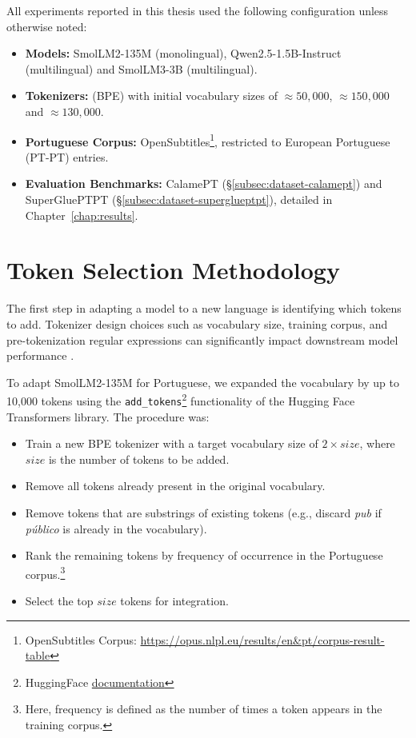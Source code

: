All experiments reported in this thesis used the following configuration unless otherwise noted:
\begin{itemize}
    \item \textbf{Models:} SmolLM2-135M (monolingual), Qwen2.5-1.5B-Instruct (multilingual) and SmolLM3-3B (multilingual).
    \item \textbf{Tokenizers:} (BPE) with initial vocabulary sizes of  $\approx 50,000$, $\approx 150,000$ and $\approx 130,000$.
    \item \textbf{Portuguese Corpus:} OpenSubtitles\footnote{OpenSubtitles Corpus: \url{https://opus.nlpl.eu/results/en&pt/corpus-result-table}}, restricted to European Portuguese (PT-PT) entries.
    \item \textbf{Evaluation Benchmarks:} CalamePT (\S\ref{subsec:dataset-calamept}) and SuperGluePTPT (\S\ref{subsec:dataset-superglueptpt}), detailed in Chapter~\ref{chap:results}.
\end{itemize}

\section{Token Selection Methodology}
\label{sec:token_selection}

The first step in adapting a model to a new language is identifying which tokens to add. Tokenizer design choices such as vocabulary size, training corpus, and pre-tokenization regular expressions can significantly impact downstream model performance \cite{dragan2024mosttoken}.

To adapt SmolLM2-135M for Portuguese, we expanded the vocabulary by up to 10,000 tokens using the \texttt{add\_tokens}\footnote{HuggingFace \href{https://huggingface.co/docs/transformers/v4.56.1/en/main\_classes/tokenizer\#transformers.PreTrainedTokenizer.add\_tokens}{documentation}} functionality of the Hugging Face Transformers library. The procedure was:

\begin{itemize}
    \item Train a new BPE tokenizer with a target vocabulary size of $2 \times size$, where $size$ is the number of tokens to be added.
    \item Remove all tokens already present in the original vocabulary.
    \item Remove tokens that are substrings of existing tokens (e.g., discard \textit{pub} if \textit{público} is already in the vocabulary).
    \item Rank the remaining tokens by frequency of occurrence in the Portuguese corpus.\footnote{Here, frequency is defined as the number of times a token appears in the training corpus.}
    \item Select the top $size$ tokens for integration.
\end{itemize}

